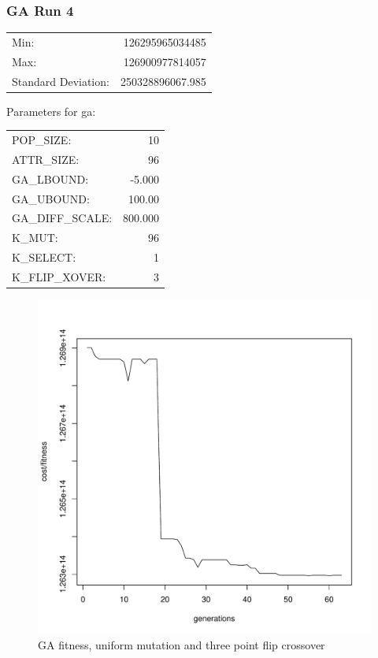 \subsubsection{GA Run 4}
\begin{tabular}{lr}
	Min: 			& 126295965034485 \\
	Max:			& 126900977814057 \\
	Standard Deviation:	&  250328896067.985 \\
\end{tabular}

Parameters for ga:\\
\begin{tabular}{lr}
	POP\_SIZE:	& 10 \\
	ATTR\_SIZE:	& 96 \\
	GA\_LBOUND:	& -5.000 \\
	GA\_UBOUND:	& 100.00 \\
	GA\_DIFF\_SCALE: & 800.000 \\
	K\_MUT:		& 96 \\
	K\_SELECT:	& 1 \\
	K\_FLIP\_XOVER:	& 3 \\
\end{tabular}

\begin{figure}[!h]
	\begin{center}
		\includegraphics[width=120mm]{output/ga04/graph.pdf}
               	\caption{GA fitness, uniform mutation and three point flip crossover}
                \label{saXX_exc}
        \end{center}
\end{figure}


